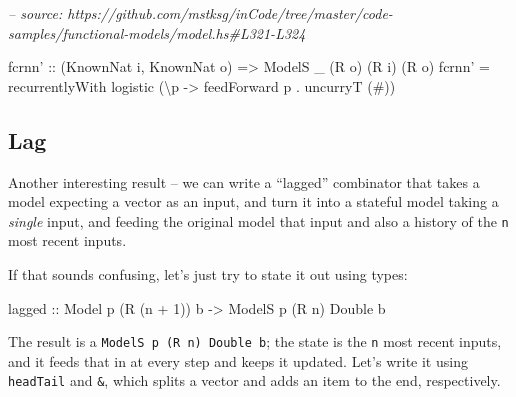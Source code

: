 \documentclass[]{article}
\newenvironment{Shaded}{}{}
\newcommand{\CommentTok}[1]{\textcolor[rgb]{0.38,0.63,0.69}{\textit{#1}}}
\newcommand{\DataTypeTok}[1]{\textcolor[rgb]{0.56,0.13,0.00}{#1}}
\newcommand{\DecValTok}[1]{\textcolor[rgb]{0.25,0.63,0.44}{#1}}
\newcommand{\FunctionTok}[1]{\textcolor[rgb]{0.02,0.16,0.49}{#1}}
\newcommand{\NormalTok}[1]{#1}
\newcommand{\OtherTok}[1]{\textcolor[rgb]{0.00,0.44,0.13}{#1}}
\begin{document}
\begin{Shaded}
\begin{Highlighting}[]
\CommentTok{-- source: https://github.com/mstksg/inCode/tree/master/code-samples/functional-models/model.hs#L321-L324}

\NormalTok{fcrnn'}
\OtherTok{    ::}\NormalTok{ (}\DataTypeTok{KnownNat}\NormalTok{ i, }\DataTypeTok{KnownNat}\NormalTok{ o)}
    \OtherTok{=>} \DataTypeTok{ModelS}\NormalTok{ _ (}\DataTypeTok{R}\NormalTok{ o) (}\DataTypeTok{R}\NormalTok{ i) (}\DataTypeTok{R}\NormalTok{ o)}
\NormalTok{fcrnn' }\FunctionTok{=}\NormalTok{ recurrentlyWith logistic (\textbackslash{}p }\OtherTok{->}\NormalTok{ feedForward p }\FunctionTok{.}\NormalTok{ uncurryT (}\FunctionTok{#}\NormalTok{))}
\end{Highlighting}
\end{Shaded}

\hypertarget{lag}{%
\subsection{Lag}\label{lag}}

Another interesting result -- we can write a ``lagged'' combinator that takes a
model expecting a vector as an input, and turn it into a stateful model taking a
\emph{single} input, and feeding the original model that input and also a
history of the \texttt{n} most recent inputs.

If that sounds confusing, let's just try to state it out using types:

\begin{Shaded}
\begin{Highlighting}[]
\OtherTok{lagged ::} \DataTypeTok{Model}\NormalTok{  p       (}\DataTypeTok{R}\NormalTok{ (n }\FunctionTok{+} \DecValTok{1}\NormalTok{)) b}
       \OtherTok{->} \DataTypeTok{ModelS}\NormalTok{ p (}\DataTypeTok{R}\NormalTok{ n) }\DataTypeTok{Double}\NormalTok{      b}
\end{Highlighting}
\end{Shaded}

The result is a \texttt{ModelS\ p\ (R\ n)\ Double\ b}; the state is the
\texttt{n} most recent inputs, and it feeds that in at every step and keeps it
updated. Let's write it using \texttt{headTail} and \texttt{\&}, which splits a
vector and adds an item to the end, respectively.
\end{document}
